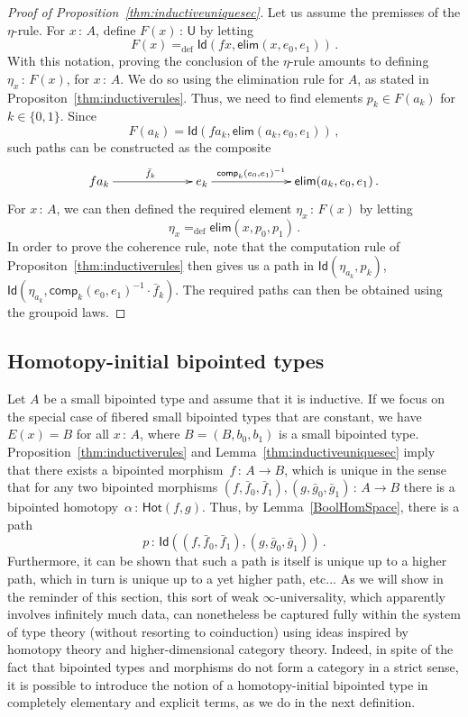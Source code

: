 \documentclass[10pt,a4paper,oneside,reqno]{amsart}
\numberwithin{equation}{section}
\theoremstyle{mythm}
\theoremstyle{mydef}
\theoremstyle{myrmk}
\newcommand{\ie}{\text{i.e.\ }}
\newcommand{\defeq}{=_{\mathrm{def}}}
\newcommand{\co}{\,{:}\,}
\newcommand{\ct}{\cdot}
\newcommand{\Hot}{\mathsf{Hot}}
\newcommand{\Id}{\mathsf{Id}}
\newcommand{\U}{\mathsf{U}}
\newcommand{\elim}{\mathsf{elim}}
\newcommand{\comp}{\mathsf{comp}}
\begin{document}
\begin{proof}[Proof of Proposition~\ref{thm:inductiveuniquesec}] Let us assume the premisses of the $\eta$-rule. For $x \co A$, define $F(x) \co \U$  by letting~
\[
F(x) \defeq 
\Id(fx, \elim(x, e_0, e_1)) \, .
\] 
With this notation, proving the conclusion of the $\eta$-rule amounts to defining
$\eta_x \co F(x)$, for $x \co A$. We do so using the elimination rule for $A$, as stated in Propositon~\ref{thm:inductiverules}.
Thus, we need to find elements $p_k \in F(a_k)$ for $k \in \{0, 1\}$. Since
\[
F(a_k) = \Id(fa_k, \elim(a_k, e_0, e_1)) \, ,
\]
such paths can be constructed as the composite
\[
\xymatrix@C=2.2cm{
 fa_k \ar[r]^{\bar{f}_k} &
 e_k \ar[r]^-{ \comp_k(e_0, e_1)^{-1}}& 
  \elim(a_k, e_0, e_1)  \, .}
\]
For $x \co A$, we can then defined the required element $\eta_x \co F(x)$ by letting 
\[
\eta_x \defeq \elim(x, p_0, p_1) \, . 
\]
In order to prove the coherence rule, note that the computation rule of Propositon~\ref{thm:inductiverules} then gives us a path in $\Id(\eta_{a_k},  p_k)$, \ie  $\Id( \eta_{a_k},  \comp_k(e_0, e_1)^{-1} \ct \bar{f}_k ) $. 
The required paths can then be obtained using the groupoid laws.
 \end{proof} 
 

\subsection{Homotopy-initial bipointed types} 
 Let $A$ be a small bipointed type and assume that it is inductive. 
  If we focus on the special case of fibered small bipointed types that 
are constant, \ie we have $E(x) = B$ for all $x \co A$, where $B = (B, b_0, b_1)$  is
a small bipointed type. 
 Proposition~\ref{thm:inductiverules} and Lemma~\ref{thm:inductiveuniquesec}
imply that there exists a bipointed morphism~$f \co A \to B$, which is unique in the sense that  for any two bipointed morphisms $(f, \bar{f}_0, \bar{f}_1), (g, \bar{g}_0, \bar{g}_1) \co A \to B$  there is a bipointed 
homotopy~$\alpha \co \Hot(f, g)$. Thus, by Lemma~\ref{BoolHomSpace}, there is a path 
\[
p \co \Id((f, \bar{f}_0, \bar{f}_1), (g, \bar{g}_0, \bar{g}_1)) \, .
\] 
Furthermore, it can be shown that such a path is itself is unique up to a higher path, which in turn is unique up to a yet higher path, etc... As we will show in the reminder of this section, this sort of weak $\infty$-universality, which apparently involves infinitely much data, can nonetheless be captured fully within the system of type theory (without resorting to coinduction) using ideas inspired by homotopy theory and higher-dimensional category theory. Indeed, in spite of the fact that bipointed types and morphisms do not form a category in a strict sense, it is possible to introduce the  notion of a homotopy-initial bipointed type in completely elementary and explicit terms, as we do in the next definition.
\end{document}
